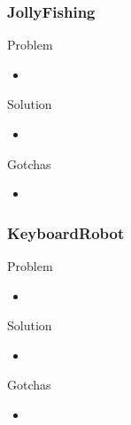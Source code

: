 \documentclass{beamer}
\begin{document}
\begin{frame}
    \frametitle{JollyFishing}
    \begin{block}{Problem}
        \begin{itemize}
            \item 
        \end{itemize}
    \end{block}
    \begin{block}{Solution}
        \begin{itemize}
            \item 
        \end{itemize}
    \end{block}
    \begin{block}{Gotchas}
        \begin{itemize}
            \item 
        \end{itemize}
    \end{block}
\end{frame}

\begin{frame}
    \frametitle{KeyboardRobot}
    \begin{block}{Problem}
        \begin{itemize}
            \item 
        \end{itemize}
    \end{block}
    \begin{block}{Solution}
        \begin{itemize}
            \item 
        \end{itemize}
    \end{block}
    \begin{block}{Gotchas}
        \begin{itemize}
            \item 
        \end{itemize}
    \end{block}
\end{frame}
\end{document}

